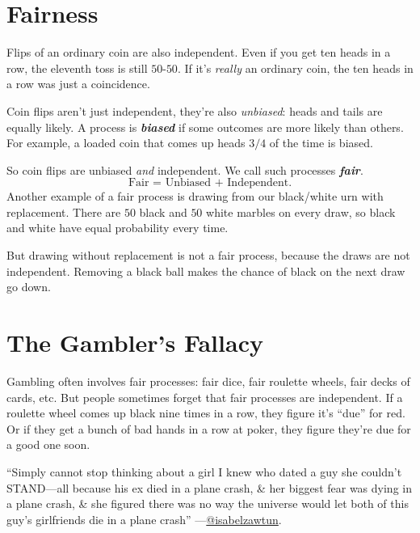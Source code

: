 \documentclass[justified]{tufte-book}
\theoremstyle{definition}
\theoremstyle{definition}
\theoremstyle{definition}
\theoremstyle{definition}
\theoremstyle{remark}
\begin{document}
\hypertarget{fairness}{%
\section{Fairness}\label{fairness}}

Flips of an ordinary coin are also independent. Even if you get ten heads in a row, the eleventh toss is still \(50\)-\(50\). If it's \emph{really} an ordinary coin, the ten heads in a row was just a coincidence.

Coin flips aren't just independent, they're also \emph{unbiased}: heads and tails are equally likely. A process is \textbf{\emph{biased}} if some outcomes are more likely than others. For example, a loaded coin that comes up heads \(3/4\) of the time is biased.

So coin flips are unbiased \emph{and} independent. We call such processes \textbf{\emph{fair}}.
\[ \mbox{Fair = Unbiased + Independent}.\]
Another example of a fair process is drawing from our black/white urn with replacement. There are \(50\) black and \(50\) white marbles on every draw, so black and white have equal probability every time.

But drawing without replacement is not a fair process, because the draws are not independent. Removing a black ball makes the chance of black on the next draw go down.

\hypertarget{the-gamblers-fallacy-1}{%
\section{The Gambler's Fallacy}\label{the-gamblers-fallacy-1}}

Gambling often involves fair processes: fair dice, fair roulette wheels, fair decks of cards, etc. But people sometimes forget that fair processes are independent. If a roulette wheel comes up black nine times in a row, they figure it's ``due'' for red. Or if they get a bunch of bad hands in a row at poker, they figure they're due for a good one soon.

\begin{marginfigure}
``Simply cannot stop thinking about a girl I knew who dated a guy she
couldn't STAND---all because his ex died in a plane crash, \& her
biggest fear was dying in a plane crash, \& she figured there was no way
the universe would let both of this guy's girlfriends die in a plane
crash''
---\href{https://twitter.com/isabelzawtun/status/1329537047837675522?s=20}{@isabelzawtun}.
\end{marginfigure}
\end{document}
